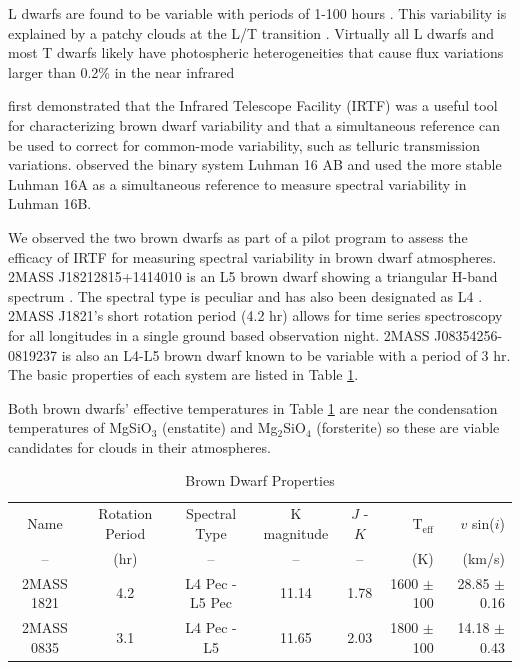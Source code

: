 \documentclass[twocolumn]{aastex6}
\begin{document}
L dwarfs are found to be variable with periods of 1-100 hours \citep{bailer-jones1999bdvar,bailer-jones1999varevo}.
This variability is explained by a patchy clouds at the L/T transition \citep{marley2010patchyc}.
Virtually all L dwarfs and most T dwarfs likely have photospheric heterogeneities that cause flux variations larger than 0.2\% in the near infrared \citep{metchev2015weatherII}

\citet{burgaser2014irtf} first demonstrated that the Infrared Telescope Facility (IRTF) was a useful tool for characterizing brown dwarf variability and that a simultaneous reference can be used to correct for common-mode variability, such as telluric transmission variations.
\citet{burgaser2014irtf} observed the binary system Luhman 16 AB and used the more stable Luhman 16A as a simultaneous reference to measure spectral variability in Luhman 16B.

We observed the two brown dwarfs as part of a pilot program to assess the efficacy of IRTF for measuring spectral variability in brown dwarf atmospheres.
2MASS J18212815+1414010 is an L5 brown dwarf showing a triangular H-band spectrum \citep{looper2008peculiarLdwarfs}.
The spectral type is peculiar and has also been designated as L4 \citep{gagne2015banyan7}.
2MASS J1821's short rotation period (4.2 hr) allows for time series spectroscopy for all longitudes in a single ground based observation night.
2MASS J08354256-0819237 \citep{cruz2003coolNeighbors} is also an L4-L5 brown dwarf known to be variable with a period of 3 hr.
The basic properties of each system are listed in Table \ref{tab:bdProp}.

Both brown dwarfs' effective temperatures in Table \ref{tab:bdProp} are near the condensation temperatures of MgSiO$_3$ (enstatite) and Mg$_2$SiO$_4$ (forsterite) \citep{marley2015rev} so these are viable candidates for clouds in their atmospheres.

\begin{table}
\begin{center}
\caption{Brown Dwarf Properties}\label{tab:bdProp}
\begin{tabular}{cccccrr}
Name & Rotation Period & Spectral Type & K magnitude  & $J$ - $K$ & T$_\mathrm{eff}$ &  $v$ sin($i$) \\
-- & (hr) & -- & -- & -- & (K) & (km/s) \\
\hline \hline
2MASS 1821 & 4.2\tablenotemark{a} & L4 Pec\tablenotemark{b} - L5 Pec\tablenotemark{c} & 11.14 & 1.78 & 1600 $\pm$ 100\tablenotemark{b} & 28.85 $\pm$ 0.16\tablenotemark{d}\\
2MASS 0835 & 3.1\tablenotemark{e} & L4 Pec\tablenotemark{b} - L5\tablenotemark{f} & 11.65 & 2.03 & 1800 $\pm$ 100\tablenotemark{b} & 14.18 $\pm$ 0.43\tablenotemark{d} \\
\end{tabular}
\end{center}
\end{table}
\end{document}
